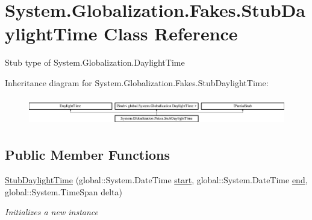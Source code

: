 \hypertarget{class_system_1_1_globalization_1_1_fakes_1_1_stub_daylight_time}{\section{System.\-Globalization.\-Fakes.\-Stub\-Daylight\-Time Class Reference}
\label{class_system_1_1_globalization_1_1_fakes_1_1_stub_daylight_time}
}


Stub type of System.\-Globalization.\-Daylight\-Time 


Inheritance diagram for System.\-Globalization.\-Fakes.\-Stub\-Daylight\-Time\-:\begin{figure}[H]
\begin{center}
\leavevmode
\includegraphics[height=1.236203cm]{class_system_1_1_globalization_1_1_fakes_1_1_stub_daylight_time}
\end{center}
\end{figure}
\subsection*{Public Member Functions}
\begin{DoxyCompactItemize}
\item 
\hyperlink{class_system_1_1_globalization_1_1_fakes_1_1_stub_daylight_time_a52c7b747fdb39f09d3f71ee68c91de00}{Stub\-Daylight\-Time} (global\-::\-System.\-Date\-Time \hyperlink{jquery-1_810_82_8js_aef10902ffededd983608fdb8dbfc441a}{start}, global\-::\-System.\-Date\-Time \hyperlink{jquery-1_810_82-vsdoc_8js_af2ce7c86b4e6e9d61f85745258f4ef32}{end}, global\-::\-System.\-Time\-Span delta)
\begin{DoxyCompactList}\small\item\em Initializes a new instance\end{DoxyCompactList}\end{DoxyCompactItemize}
